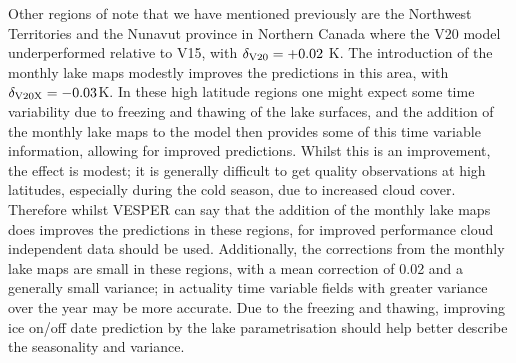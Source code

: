 \documentclass[twocolumn]{article}
\begin{document}
	\noindent Other regions of note that we have mentioned previously are the Northwest Territories and the Nunavut province in Northern Canada where the V20 model underperformed relative to V15, with $\delta_{\rm V20} = +0.02$ K. The introduction of the monthly lake maps modestly improves the predictions in this area, with $\delta_{\rm V20X} = -0.03$K.  In these high latitude regions one might expect some time variability due to freezing and thawing of the lake surfaces, and the addition of the monthly lake maps to the model then provides some of this time variable information, allowing for improved predictions.  Whilst this is an improvement, the effect is modest; it is generally difficult to get quality observations at high latitudes, especially during the cold season, due to increased cloud cover. Therefore whilst VESPER can say that the addition of the monthly lake maps does improves the predictions in these regions, for improved performance cloud independent data should be used.  Additionally, the corrections from the monthly lake maps are small in these regions, with a mean correction of 0.02 and a generally small variance; in actuality time variable fields with greater variance over the year may be more accurate. Due to the freezing and thawing, improving ice on/off date prediction by the lake parametrisation should help better describe the seasonality and variance. \newline 
	
\end{document}

